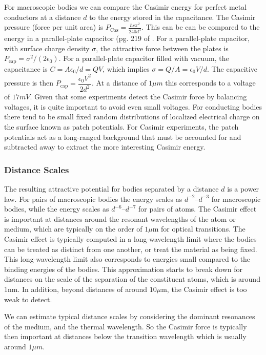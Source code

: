 For macroscopic bodies we can compare the Casimir energy for perfect 
metal conductors at a distance $d$ to the energy stored in the capacitance.
The Casimir pressure (force per unit area) is $P_{\text{Cas}}=\frac{\hbar c\pi^2}{240 d^3}$.
This can be can be compared to the energy in a parallel-plate capacitor (pg. 219 of \cite{Milonni1994}.
For a parallel-plate capacitor, with surface charge density $\sigma$, the attractive force 
between the plates is $P_{\text{cap}}=\sigma^2/(2\epsilon_0)$.  For a parallel-plate capacitor filled with
vacuum, the capacitance is $C=A\epsilon_0/d = QV$, which implies $\sigma=Q/A=\epsilon_0V/d$.
The capacitive pressure is then $P_{\text{cap}}= \dfrac{\epsilon_0 V^2}{2d^2}$.  At a distance of $1\mu m$
this corresponds to a voltage of $17 mV$.  
Given that some experiments detect the Casimir force by balancing voltages, it is  quite important
to avoid even small voltages.  For conducting bodies there tend to be small fixed random distributions 
of localized electrical charge on the surface known as patch potentials.  For Casimir experiments, the patch potentials 
act as a long-ranged background that must be accounted for and subtracted away to extract
the more interesting Casimir energy.  

\subsubsection{Distance Scales}

The resulting attractive potential for bodies separated by a distance $d$ is a power law.
For pairs of macroscopic bodies the energy scales as $d^{-2}$--$d^{-3}$ for macroscopic bodies, 
while the energy scales as $d^{-6}$--$d^{-7}$ for pairs of atoms.  
The Casimir effect is important at distances around the resonant
wavelengths of the atom or medium, which are typically on the order of $1\mu$m for optical transitions.  
The Casimir effect is typically computed in a long-wavelength limit where the bodies can be treated 
as distinct from one another, or treat the material as being fixed.
This long-wavelength limit also corresponds to energies small compared to the binding energies of the bodies.
This approximation starts to break down for distances on the scale of the separation of the constituent atoms,
which is around $1$nm.  In addition, beyond distances of around $10 \mu$m, the Casimir effect is too
weak to detect.  

We can estimate typical distance scales by considering the dominant 
resonances of the medium, and the thermal wavelength.
 So the Casimir force is typically then important at distances below the
 transition wavelength which is usually around $1\mu m$.    
    
